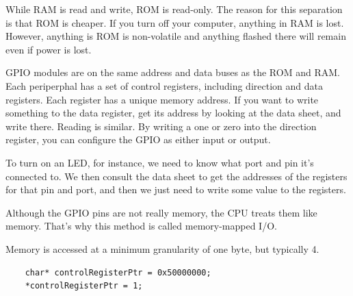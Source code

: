 While RAM is read and write, ROM is read-only. The reason for this separation
is that ROM is cheaper. If you turn off your computer, anything in RAM is lost.
However, anything is ROM is non-volatile and anything flashed there will remain
even if power is lost.

GPIO modules are on the same address and data buses as the ROM and RAM. Each
periperphal has a set of control registers, including direction and data registers.
Each register has a unique memory address. If you want to write something
to the data register, get its address by looking at the data sheet, and write
there. Reading is similar. By writing a one or zero into the direction register,
you can configure the GPIO as either input or output.

To turn on an LED, for instance, we need to know what port and pin it's connected
to. We then consult the data sheet to get the addresses of the registers for
that pin and port, and then we just need to write some value to the registers.

Although the GPIO pins are not really memory, the CPU treats them like memory.
That's why this method is called memory-mapped I/O.

Memory is accessed at a minimum granularity of one byte, but typically 4.

\begin{lstlisting}
    char* controlRegisterPtr = 0x50000000;
    *controlRegisterPtr = 1;
\end{lstlisting}

